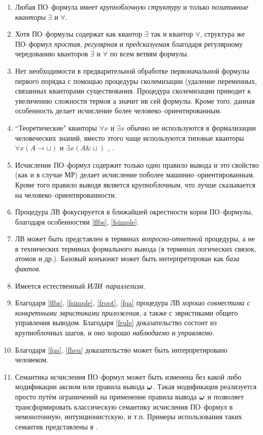 \begin{enumerate}
\item\label{flbs} Любая ПО--формула имеет {\em крупноблочную структуру} и только {\em позитивные кванторы} $\exists$ и $\forall$.
%
\item\label{fsimple} Хотя ПО--формулы содержат как квантор $\exists$ так и квантор $\forall$, структура же ПО--формул {\em простая}, {\em регулярная} и {\em предсказуемая} благодаря регулярному чередованию кванторов $\exists$ и $\forall$ по всем ветвям формулы.
%
\item Нет необходимости в предварительной обработке первоначальной формулы первого порядка с помощью процедуры сколемизации (удаление переменных, связанных кванторами существования. Процедура сколемизации приводит к увеличению сложности термов а значит ив сей формулы. Кроме того, данная особенность делает исчисление более человеко--ориентированным.
%
\item ``Теоретические" кванторы $\forall x$ и $\exists x$ обычно не используются в формализации человеческих знаний, вместо этого чаще используются типовые кванторы $\forall x(A \rightarrow \sqcup)$ и $\exists x(A \& \sqcup)$ \cite{Bourbaki}, \cite{ICDS2000}.
%
\item\label{frule} Исчисление ПО--формул содержит только одно правило вывода и это свойство (как и в случае МР) делает исчисление поболее машинно--ориентированным. Кроме того правило выводя является крупноблочным, что лучше сказывается на человеко--ориентированности.
%
\item\label{froot} Процедура ЛВ фокусируется в ближайшей окрестности корня ПО--формулы, благодаря особенностям \ref{flbs}, \ref{fsimple}.
%
\item\label{fqa} ЛВ может быть представлен в терминах {\em вопросно-ответной} процедуры, а не в технических терминах формального вывода (в терминах логических связок, атомов и др.). Базовый конъюнкт может быть интерпретирован как {\em база фактов}.
%
\item Имеется естественный {\em ИЛИ--параллелизм}.
%
\item\label{fheu} Благодаря \ref{flbs}, \ref{fsimple}, \ref{froot}, \ref{fqa} процедура ЛВ {\em хорошо совместима с конкретными эвристиками приложения}, а также с эвристиками общего управления выводом. Благодаря \ref{frule} доказательство состоит из крупноблочных шагов, и оно хорошо {\em наблюдаемо} и {\em управляемо}.
%
\item Благодаря \ref{fqa}, \ref{fheu} доказательство может быть интерпретировано человеком.
%
\item Семантика исчисления ПО--формул может быть изменена без какой либо модификации аксиом или правила вывода $\boldsymbol{\omega}$. Такая модификация реализуется просто путём ограничений на применение правила вывода $\boldsymbol{\omega}$ и позволяет трансформировать классическую семантику исчисления ПО--формул в немонотонную, интуиционистскую, и т.п. Примеры использования таких семантик представлены в \cite{ICDS2000}.
\end{enumerate}


